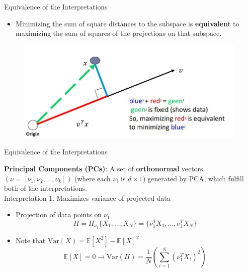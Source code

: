 \documentclass[serif, aspectratio=169]{beamer}
\begin{document}
\begin{frame}{Equivalence of the Interpretations}
    \begin{itemize}
        \item Minimizing the sum of square distances to the subspace is \textbf{equivalent} to maximizing the sum of squares of the projections on that subspace.
    \end{itemize}
    \begin{figure}[htpb]
        \begin{center}
            \includegraphics[keepaspectratio, scale=0.55]{pic/var_vs_rec2.JPG}
        \end{center}
    \end{figure}
\end{frame}

\begin{frame}{Equivalence of the Interpretations}

    \textbf{Principal Components (PCs)}: A set of \textbf{orthonormal} vectors $(\nu = [\nu_1, \nu_2, ...,\nu_k])$ (where each $\nu_i$ is $d\times 1$) generated by PCA, which fulfill both of the interpretations.\\[0.4cm]
    
    Interpretation 1. Maximizes variance of projected data\\[0.3cm]
    \begin{itemize}
        \item Projection of data points on $\nu_1$
        $$\Pi = \Pi_{\nu_1} \{ X_{1}, \dots, X_{N} \} = \{ \nu_1^T X_{1}, \dots, \nu_1^T X_{N} \}$$
        \item Note that $\text{Var}(X) = \mathbb{E}[X^2] - \mathbb{E}[X]^2$
        $$\mathbb{E}[X] = 0 \rightarrow \text{Var}(\Pi) = \frac{1}{N} \left( \sum_{i=1}^{N} (\nu_1^T X_i)^2 \right)$$
    \end{itemize}
    
\end{frame}
\end{document}
